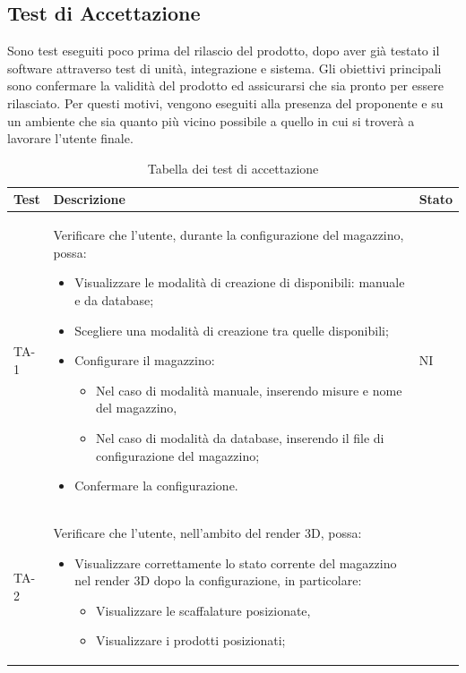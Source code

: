 \subsection{Test di Accettazione}
Sono test eseguiti poco prima del rilascio del prodotto, dopo aver già testato il software attraverso test di unità, integrazione e sistema. Gli obiettivi principali sono confermare la validità del prodotto ed assicurarsi che sia pronto per essere rilasciato. Per questi motivi, vengono eseguiti alla presenza del proponente e su un ambiente che sia quanto più vicino possibile a quello in cui si troverà a lavorare l'utente finale.
\renewcommand{\arraystretch}{1.5}
\begin{xltabular}{0.9\textwidth}{X | p{0.7\textwidth} | X}
    \textbf{\color{white} Test} & \textbf{\color{white} Descrizione} & \textbf{\color{white} Stato}\\ 
    \hline
    \endhead
    \caption{Tabella dei test di accettazione} 
    \label{tab:test_accettazione}
    \endlastfoot
    TA-1 & Verificare che l'utente, durante la configurazione del magazzino, possa:
    \begin{itemize}
        \item Visualizzare le modalità di creazione di disponibili: manuale e da database;
        \item Scegliere una modalità di creazione tra quelle disponibili;
        \item Configurare il magazzino:
        \begin{itemize}
            \item Nel caso di modalità manuale, inserendo misure e nome del magazzino,
            \item Nel caso di modalità da database, inserendo il file di configurazione del magazzino;
        \end{itemize}
        \item Confermare la configurazione.
    \end{itemize} 
    & NI \\
    TA-2 & Verificare che l'utente, nell'ambito del render 3D, possa:
    \begin{itemize}
        \item Visualizzare correttamente lo stato corrente del magazzino nel render 3D dopo la configurazione, in particolare:
        \begin{itemize}
            \item Visualizzare le scaffalature posizionate,
            \item Visualizzare i prodotti posizionati;

\end{itemize}
\end{itemize}
\end{xltabular}
